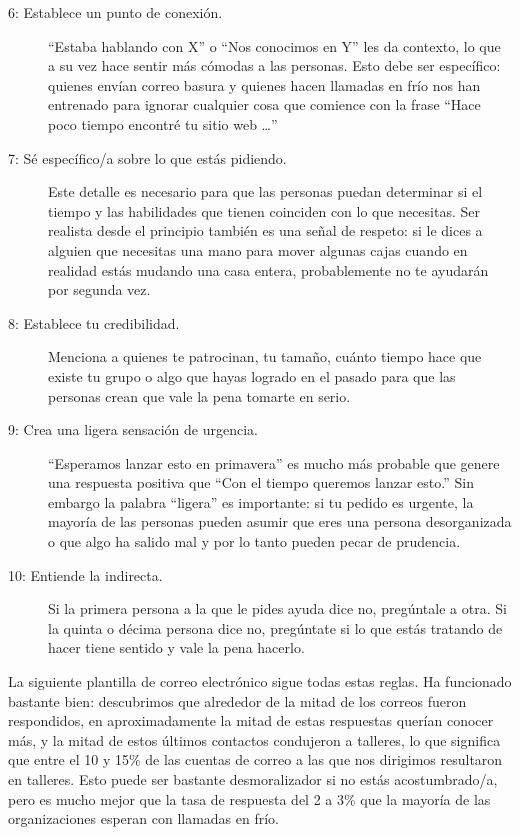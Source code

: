 \begin{description}
\item[6: Establece un punto de conexión.]
``Estaba hablando con X'' o ``Nos conocimos en Y'' les da contexto,
lo que a su vez hace sentir más cómodas a las personas.
Esto debe ser específico:
quienes envían correo basura y quienes hacen llamadas en frío
nos han entrenado para ignorar cualquier cosa que comience con la frase
``Hace poco tiempo encontré tu sitio web {\ldots}''

\item[7: Sé específico/a sobre lo que estás pidiendo.]
Este detalle es necesario para que las personas
puedan determinar si el tiempo y las habilidades que tienen
coinciden con lo que necesitas.
Ser realista desde el principio también es una señal de respeto:
 si le dices a alguien que necesitas una mano para mover algunas cajas 
 cuando en realidad estás mudando una casa entera,
 probablemente no te ayudarán por segunda vez.

\item[8: Establece tu credibilidad.]
Menciona a quienes te patrocinan,
tu tamaño,
cuánto tiempo hace que existe tu grupo o algo que hayas logrado en el pasado
para que las personas crean que vale la pena tomarte en serio.

\item[9: Crea una ligera sensación de urgencia.]
``Esperamos lanzar esto en primavera'' es mucho más probable que genere una respuesta positiva 
que ``Con el tiempo queremos lanzar esto.''
Sin embargo la palabra ``ligera'' es importante:
si tu pedido es urgente, 
la mayoría de las personas pueden asumir que eres una persona desorganizada 
o que algo ha salido mal
y por lo tanto pueden pecar de prudencia.

\item[10: Entiende la indirecta.]
Si la primera persona a la que le pides ayuda dice no,
pregúntale a otra.
Si la quinta o décima persona dice no,
pregúntate si lo que estás tratando de hacer tiene sentido y vale la pena hacerlo.
\end{description}

La siguiente plantilla de correo electrónico sigue todas estas reglas.
Ha funcionado bastante bien:
descubrimos que alrededor de la mitad de los correos fueron respondidos, en
aproximadamente  la mitad de estas respuestas querían conocer más,
y la mitad de estos últimos contactos condujeron a talleres,
lo que significa que entre el 10 y 15\% de las cuentas de correo a las que nos dirigimos resultaron en talleres.
Esto puede ser bastante desmoralizador si no estás acostumbrado/a, 
pero es mucho mejor que la tasa de respuesta del 2 a 3\% que la mayoría de las organizaciones esperan con llamadas en frío.

